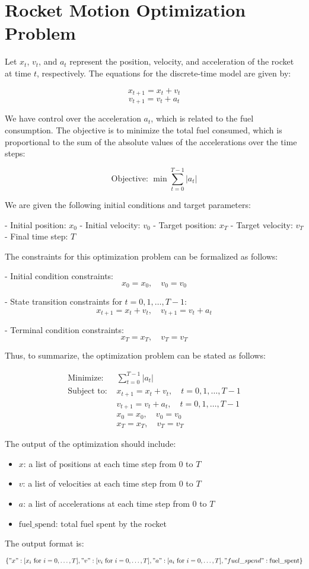 \documentclass{article}
\begin{document}
\section*{Rocket Motion Optimization Problem}

Let \( x_t \), \( v_t \), and \( a_t \) represent the position, velocity, and acceleration of the rocket at time \( t \), respectively. The equations for the discrete-time model are given by:

\[
x_{t+1} = x_t + v_t
\]
\[
v_{t+1} = v_t + a_t
\]

We have control over the acceleration \( a_t \), which is related to the fuel consumption. The objective is to minimize the total fuel consumed, which is proportional to the sum of the absolute values of the accelerations over the time steps:

\[
\text{Objective: } \min \sum_{t=0}^{T-1} |a_t|
\]

We are given the following initial conditions and target parameters:

- Initial position: \( x_0 \)
- Initial velocity: \( v_0 \)
- Target position: \( x_T \)
- Target velocity: \( v_T \)
- Final time step: \( T \)

The constraints for this optimization problem can be formalized as follows:

- Initial condition constraints:
  \[
  x_0 = x_0, \quad v_0 = v_0
  \]

- State transition constraints for \( t = 0, 1, \ldots, T-1 \):
  \[
  x_{t+1} = x_t + v_t, \quad v_{t+1} = v_t + a_t
  \]

- Terminal condition constraints:
  \[
  x_T = x_T, \quad v_T = v_T
  \]

Thus, to summarize, the optimization problem can be stated as follows:

\begin{align*}
\text{Minimize: } & \sum_{t=0}^{T-1} |a_t| \\
\text{Subject to: } & x_{t+1} = x_t + v_t, \quad t = 0, 1, \ldots, T-1 \\
& v_{t+1} = v_t + a_t, \quad t = 0, 1, \ldots, T-1 \\
& x_0 = x_0, \quad v_0 = v_0 \\
& x_T = x_T, \quad v_T = v_T
\end{align*}

The output of the optimization should include:

\begin{itemize}
    \item \( x \): a list of positions at each time step from 0 to \( T \)
    \item \( v \): a list of velocities at each time step from 0 to \( T \)
    \item \( a \): a list of accelerations at each time step from 0 to \( T \)
    \item \( \text{fuel\_spend} \): total fuel spent by the rocket
\end{itemize}

The output format is:

\[
\{ 
    "x": [x_i \text{ for } i = 0, \ldots, T],
    "v": [v_i \text{ for } i = 0, \ldots, T],
    "a": [a_i \text{ for } i = 0, \ldots, T],
    "fuel\_spend": \text{fuel\_spent}
\}
\]
\end{document}
